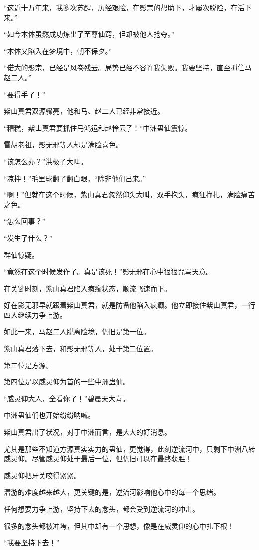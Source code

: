 \begin{this_body}
“这近十万年来，我多次苏醒，历经艰险，在影宗的帮助下，才屡次脱险，存活下来。”

“如今本体虽然成功炼出了至尊仙窍，但却被他人抢夺。”

“本体又陷入在梦境中，朝不保夕。”

“偌大的影宗，已经是风卷残云。局势已经不容许我失败。我要坚持，直至抓住马赵二人。”

“要得手了！”

紫山真君双源骤亮，他和马、赵二人已经非常接近。

“糟糕，紫山真君要抓住马鸿运和赵怜云了！”中洲蛊仙震惊。

雪胡老祖，影无邪等人却是满脸喜色。

“该怎么办？”洪极子大叫。

“凉拌！”毛里球翻了翻白眼，“除非他们出来。”

“啊！”但就在这个时候，紫山真君忽然仰头大叫，双手抱头，疯狂挣扎，满脸痛苦之色。

“怎么回事？”

“发生了什么？”

群仙惊疑。

“竟然在这个时候发作了。真是该死！”影无邪在心中狠狠咒骂天意。

在关键时刻，紫山真君陷入疯癫状态，顺流飞速而下。

好在影无邪早就跟着紫山真君，就是防备他陷入疯癫。他立即接住紫山真君，一行四人继续力争上游。

如此一来，马赵二人脱离险境，仍旧是第一位。

紫山真君落下去，和影无邪等人，处于第二位置。

第三位是方源。

第四位是以威灵仰为首的一些中洲蛊仙。

“威灵仰大人，全看你了！”碧晨天大喜。

中洲蛊仙们也开始纷纷呐喊。

紫山真君出了状况，对于中洲而言，是大大的好消息。

尤其是那些不知道方源真实实力的蛊仙，更觉得，此刻逆流河中，只剩下中洲八转威灵仰。尽管威灵仰处于最后一位，但仍旧可以在最终获胜！

威灵仰把牙关咬得紧紧。

潜游的难度越来越大，更关键的是，逆流河影响他心中的每一个思绪。

任何想要力争上游，坚持下去的念头，都会受到逆流河的冲击。

很多的念头都被冲垮，但其中却有一个思想，像是在威灵仰的心中扎下根！

“我要坚持下去！”


\end{this_body}
